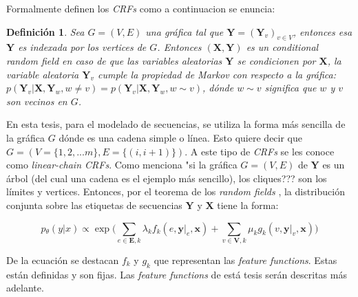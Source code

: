 \documentclass[letterpaper,12pt,oneside]{book}
\newtheorem{definition}{Definición}
\begin{document}
	
	Formalmente \citet{lafferty2001conditional} definen los \textit{CRFs} como a continuacion se enuncia:

	
	\begin{definition}

		Sea $G = (V,E)$ una gráfica tal que $\mathbf{Y} = (\mathbf{Y}_{v})_{v \in V}$, entonces esa $\mathbf{Y}$ es indexada por los vertices de $G$. Entonces $(\mathbf{X}, \mathbf{Y})$ es un \textsf{conditional random field} en caso de que las variables aleatorias $\mathbf{Y}$ se condicionen por $\mathbf{X}$, la variable aleatoria $\mathbf{Y}_{v}$ cumple la \textit{propiedad de Markov} con respecto a la gráfica: $p(\mathbf{Y}_{v}|\mathbf{X},\mathbf{Y}_{w},w \ne v) = p(\mathbf{Y}_{v}|\mathbf{X},\mathbf{Y}_{w},w \sim v)$, dónde $w \sim v$ significa que $w$ y $v$ son vecinos en $G$.

	\end{definition}

	
	En esta tesis, para el modelado de secuencias, se utiliza la forma más sencilla de la gráfica $G$ dónde es una cadena simple o línea. Esto quiere decir que $G = (V = \{1,2,...m\}, E = \{(i,i+1)\})$. A este tipo de \textit{CRFs} se les conoce como \textit{linear-chain CRFs}. Como menciona \citet{lafferty2001conditional} "si la gráfica $G = (V,E)$ de $\mathbf{Y}$ es un árbol (del cual una cadena es el ejemplo más sencillo), los cliques??? son los límites y vertices. Entonces, por el teorema de los \textit{random fields} \citep{hammersley1971markov}, la distribución conjunta sobre las etiquetas de secuencias $\mathbf{Y}$ y $\mathbf{X}$ tiene la forma:

	
	


	\begin{equation}

	p{_{\theta}}(y|x) \propto \exp \bigg( \sum\limits_{e \in \mathbf{E},k} \lambda_{k}f_{k}(e,\mathbf{y}|_{e},\mathbf{x}) + \sum\limits_{v \in \mathbf{V},k}\mu_{k}g_{k}(v,\mathbf{y}|_{v},\mathbf{x}) \bigg)

	\end{equation}

	


	
	De la ecuación  se destacan $f_{k}$ y $g_{k}$ que representan las \textit{feature functions}. Estas están definidas y son fijas. Las \textit{feature functions} de está tesis serán descritas más adelante. 
\end{document}
